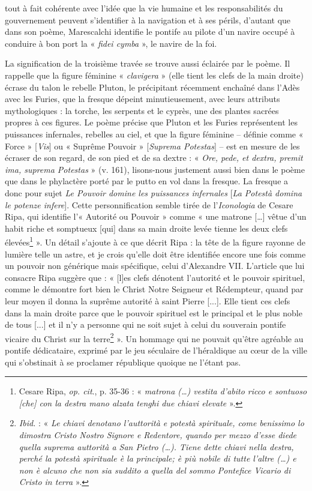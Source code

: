 \documentclass[12pt,twoside,openany]{book}
\begin{document}
tout à fait cohérente avec l’idée que la vie humaine et les responsabilités du gouvernement peuvent s’identifier à la navigation et à ses périls, d’autant que dans son poème, Marescalchi identifie le pontife au pilote d’un navire occupé à conduire à bon port la « \textit{fidei cymba} », le navire de la foi.

La signification de la troisième travée se trouve aussi éclairée par le poème. Il rappelle que la figure féminine « \textit{clavigera} » (elle tient les clefs de la main droite) écrase du talon le rebelle Pluton, le précipitant récemment enchaîné dans l’Adès avec les Furies, que la fresque dépeint minutieusement, avec leurs attributs mythologiques : la torche, les serpents et le cyprès, une des plantes sacrées propres à ces figures. Le poème précise que Pluton et les Furies représentent les puissances infernales, rebelles au ciel, et que la figure féminine – définie comme « Force » [\textit{Vis}] ou « Suprême Pouvoir » [\textit{Suprema Potestas}] – est en mesure de les écraser de son regard, de son pied et de sa dextre : « \textit{Ore, pede, et dextra, premit ima, suprema Potestas} » (v. 161), lisons-nous justement aussi bien dans le poème que dans le phylactère porté par le putto en vol dans la fresque. La fresque a donc pour sujet \textit{Le Pouvoir domine les puissances infernales }[\textit{La Potestà domina le potenze infere}]. Cette personnification semble tirée de l’\textit{Iconologia }de Cesare Ripa, qui identifie l’« Autorité ou Pouvoir » comme « une matrone […] vêtue d’un habit riche et somptueux [qui] dans sa main droite levée tienne les deux clefs élevées\footnote{Cesare Ripa, \textit{op. cit}., p. 35-36 : « \textit{matrona (…) vestita d’abito ricco e sontuoso [che] con la destra mano alzata tenghi due chiavi elevate} ».} ». Un détail s’ajoute à ce que décrit Ripa : la tête de la figure rayonne de lumière telle un astre, et je crois qu’elle doit être identifiée encore une fois comme un pouvoir non générique mais spécifique, celui d’Alexandre VII. L’article que lui consacre Ripa suggère que : « [l]es clefs dénotent l’autorité et le pouvoir spirituel, comme le démontre fort bien le Christ Notre Seigneur et Rédempteur, quand par leur moyen il donna la suprême autorité à saint Pierre [...]. Elle tient ces clefs dans la main droite parce que le pouvoir spirituel est le principal et le plus noble de tous [...] et il n’y a personne qui ne soit sujet à celui du souverain pontife vicaire du Christ sur la terre\footnote{\textit{Ibid.} : « \textit{Le chiavi denotano l’auttorità e potestà spirituale, come benissimo lo dimostra Cristo Nostro Signore e Redentore, quando per mezzo d’esse diede quella suprema auttorità a San Pietro (…). Tiene dette chiavi nella destra, perché la potestà spirituale è la principale; è più nobile di tutte l’altre (…) e non è alcuno che non sia suddito a quella del sommo Pontefice Vicario di Cristo in terra} ».} ». Un hommage qui ne pouvait qu’être agréable au pontife dédicataire, exprimé par le jeu séculaire de l’héraldique au cœur de la ville qui s’obstinait à se proclamer république quoique ne l’étant pas.
\end{document}
